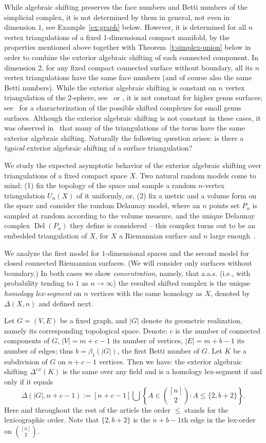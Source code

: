 \documentclass[reqno,english]{amsart}
\numberwithin{claimcounter}{theorem}
\theoremstyle{remark}
\theoremstyle{definition}
\numberwithin{theorem}{section}
\DeclareMathOperator{\Del}{Del}
\newcommand{\exshift}[1]{\Delta^{ex}(#1)}
\begin{document}
While algebraic shifting preserves the face numbers and Betti numbers of the  simplicial complex, it is not determined by them in general, not even in dimension $1$, see Example~\ref{ex:graph} below. However, it is determined for all $n$ vertex triangulations of a fixed 1-dimensional compact manifold, by the properties mentioned above together with Theorem~\ref{t:simplex-union} below in order to combine the exterior algebraic shifting of each connected component.
In dimension 2, 
for any fixed compact connected surface without boundary, all its $n$ vertex triangulations have the same face numbers (and of course also the same Betti numbers).
While the exterior algebraic shifting is constant on $n$ vertex triangulation of the 2-sphere, see~\cite[Sec.2.4]{kalai02-shifting} or \cite[Footnote 2]{keehn24-exterior}, it is not constant for higher genus surfaces; see~\cite{keehn24-exterior} for a characterization of the possible shifted complexes for small genus surfaces. 
Although the exterior algebraic shifting is not constant in these cases, it was observed in~\cite[Remarks 5.3]{keehn24-exterior} that many of the triangulations of the torus have the same exterior algebraic shifting. Naturally the following question arises: is there a \emph{typical} exterior algebraic shifting of a surface triangulation?


We study the expected asymptotic behavior of the exterior algebraic shifting  
over triangulations of a fixed compact space $X$.
Two natural random models come to mind:
(1)
fix the topology of the space and sample a random $n$-vertex triangulation $U_n(X)$ of it
uniformly, or, 
(2)
fix a metric and a volume form on the space
and consider the random Delaunay model, where an $n$ points set $P_n$ is sampled at random according to the volume measure, and the unique Delaunay complex $\Del(P_n)$ they define is considered -- this complex turns out to be an embedded triangulation of $X$, for $X$ a Riemannian surface and $n$ large enough~\cite{leibon99-delaunay,dyer08-surface}. 


We analyze the first model for $1$-dimensional spaces and the second model for closed connected Riemannian surfaces. (We will consider only surfaces without boundary.) 
In both cases we show \textit{concentration}, namely, that a.a.s. (i.e., with probability tending to $1$ as $n\to\infty$) the resulted shifted complex is the unique \emph{homology lex-segment} on $n$ vertices with the same homology as $X$, denoted by $\Delta(X,n)$ and defined next. 

Let $G=(V,E)$ be a fixed graph, and $|G|$ denote its geometric realization, namely its corresponding topological space. Denote: $c$ is the number of connected components of $G$, $|V|=m+c-1$ its number of vertices, $|E|=m+b-1$ its number of edges; thus $b=\beta_1(|G|)$, the first Betti number of $G$.
Let $K$ be a subdivision of $G$ on $n+c-1$ vertices. Then we have: the exterior algebraic shifting $\exshift K$ is the same over any field and 
is a homology lex-segment if and only if it equals 
$$\Delta(|G|,n+c-1) := [n+c-1] \bigcup \left \{A \in \binom{[n]}{2}\colon A \leq \{2,b+2\} \right \}.$$
Here and throughout the rest of the article the order $\leq$ stands for the lexicographic order.
Note that $\{2,b+2\}$ is the $n+b-1$th edge in the lex-order on $\binom{[n]}{2}$.
\end{document}
